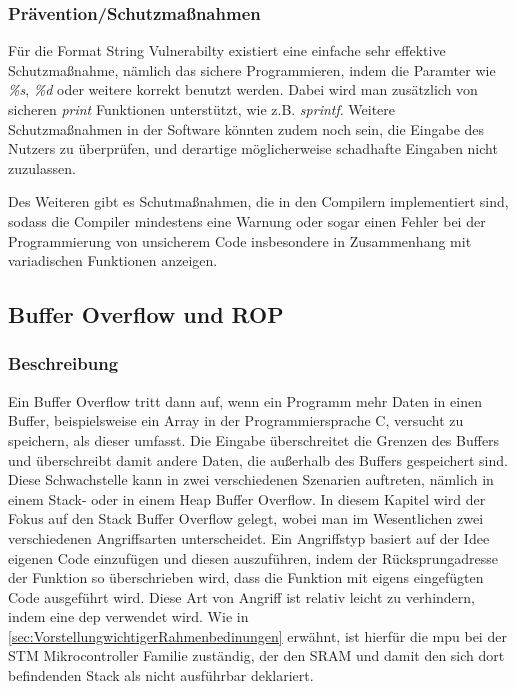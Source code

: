 \documentclass[a4paper,
DIV=13,
12pt,
BCOR=10mm,
department=FakIM,
oneside,
parskip=half,
automark,
listof=totocnumbered,
bibliography=totocnumbered,
acronym=totocnumbered
] {OTHRartcl}
\begin{document}
\subsubsection{Prävention/Schutzmaßnahmen}
Für die Format String Vulnerabilty existiert eine einfache sehr effektive Schutzmaßnahme, nämlich
das sichere Programmieren, indem die Paramter wie \textit{\%s}, \textit{\%d} oder weitere korrekt benutzt werden.
Dabei wird man zusätzlich von sicheren \textit{print} Funktionen unterstützt, wie z.B. \textit{sprintf}.
Weitere Schutzmaßnahmen in der Software könnten zudem noch sein, die Eingabe des Nutzers zu überprüfen, und
derartige möglicherweise schadhafte Eingaben nicht zuzulassen.

Des Weiteren gibt es Schutmaßnahmen, die in den Compilern implementiert sind, sodass die Compiler mindestens eine Warnung oder sogar einen Fehler
bei der Programmierung von unsicherem Code insbesondere in Zusammenhang mit variadischen Funktionen anzeigen. \cite{OWASP Format String Vuln.}

\subsection{Buffer Overflow und ROP}
\subsubsection{Beschreibung}
Ein Buffer Overflow tritt dann auf, wenn ein Programm mehr Daten in einen Buffer, beispielsweise ein Array in der Programmiersprache C, versucht zu speichern, als
dieser umfasst. \cite{OWASP Buffer Overflow}
Die Eingabe überschreitet die Grenzen des Buffers und überschreibt damit andere Daten, die außerhalb des Buffers gespeichert sind.
Diese Schwachstelle kann in zwei verschiedenen Szenarien auftreten, nämlich in einem Stack- oder in einem Heap Buffer Overflow.
In diesem Kapitel wird der Fokus auf den Stack Buffer Overflow gelegt, wobei man im Wesentlichen zwei verschiedenen Angriffsarten unterscheidet.
Ein Angriffstyp basiert auf der Idee eigenen Code einzufügen und diesen auszuführen, indem der Rücksprungadresse der Funktion so überschrieben wird, dass die Funktion
mit eigens eingefügten Code ausgeführt wird. Diese Art von Angriff ist relativ leicht zu verhindern, indem eine \ac{dep} verwendet wird. \cite{IEEE Xplore ROP}
Wie in \autoref{sec:VorstellungwichtigerRahmenbedinungen} erwähnt, ist hierfür die \ac{mpu} bei der STM Mikrocontroller Familie zuständig, der den SRAM und damit den sich dort befindenden Stack als nicht ausführbar deklariert.
\end{document}
